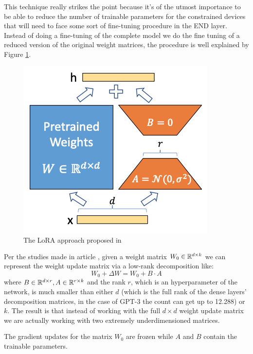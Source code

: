This technique really strikes the point because it's of the utmost importance to be able to reduce
the number of trainable parameters for the constrained devices that will need to face some sort of
fine-tuning procedure in the END layer. Instead of doing a fine-tuning of the complete model we do
the fine tuning of a reduced version of the original weight matrices, the procedure is well
explained by Figure \ref{fig:lora}.
\begin{figure}
	\label{fig:lora}
	\centering
	\includegraphics[scale=0.7]{figures/lora.png}
	\caption{The LoRA approach proposed in \cite{lora}}
\end{figure}
Per the studies made in article \cite{lora}, given a weight matrix $W_0 \in \mathbb{R}^{d \times k}$ we can
represent the weight update matrix via a low-rank decomposition like:
\begin{equation}
	W_0 + \Delta W = W_0 + B \cdot A
\end{equation}
where $B \in \mathbb{R}^{d \times r}, A \in \mathbb{R}^{r \times k}$ and the rank $r$, which is an hyperparameter of
the network, is much smaller than either $d$ (which is the full rank of the dense layers' decomposition matrices, in the case of GPT-3 the
count can get up to 12.288) or $k$. The result is that instead of working with the full $d \times d$
weight update matrix we are actually working with two extremely underdimensioned matrices.

The gradient updates for the matrix $W_0$ are frozen while $A$ and $B$ contain the trainable
parameters.

